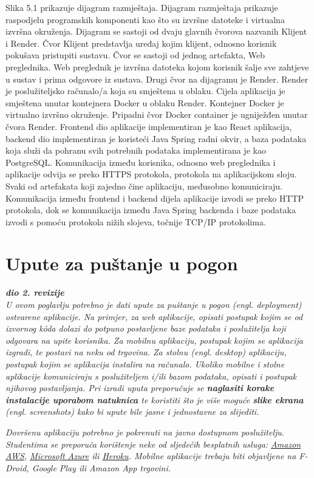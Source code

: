 			 Slika 5.1 prikazuje dijagram razmještaja. Dijagram razmještaja prikazuje raspodjelu programskih komponenti kao što su izvršne datoteke i virtualna izvršna okruženja. Dijagram se sastoji od dvaju glavnih čvorova nazvanih Klijent i Render. Čvor Klijent predstavlja uređaj kojim klijent, odnosno korisnik pokušava pristupiti sustavu. Čvor se sastoji od jednog artefakta, Web preglednika. Web preglednik je izvršna datoteka kojom korisnik šalje sve zahtjeve u sustav i prima odgovore iz sustava. Drugi čvor na dijagramu je Render. Render je poslužiteljsko računalo/a koja su smještena u oblaku. Cijela aplikacija je smještena unutar kontejnera Docker u oblaku Render. Kontejner Docker je virtualno izvršno okruženje. Pripadni čvor Docker container je ugniježđen unutar čvora Render. Frontend dio aplikacije implementiran je kao React aplikacija, backend dio implementiran je koristeći Java Spring radni okvir, a baza podataka koja služi da pohranu svih potrebnih podataka implementirana je kao PostgreSQL. Komunikacija između korisnika, odnosno web preglednika i aplikacije odvija se preko HTTPS protokola, protokola na aplikacijskom sloju. Svaki od artefakata koji zajedno čine aplikaciju, međusobno komuniciraju. Komunikacija između frontend i backend dijela aplikacije izvodi se preko HTTP protokola, dok se komunikacija između Java Spring backenda i baze podataka izvodi s pomoću protokola nižih slojeva, točnije TCP/IP protokolima.
			
			\eject 
		
		\section{Upute za puštanje u pogon}
		
			\textbf{\textit{dio 2. revizije}}\\
		
			 \textit{U ovom poglavlju potrebno je dati upute za puštanje u pogon (engl. deployment) ostvarene aplikacije. Na primjer, za web aplikacije, opisati postupak kojim se od izvornog kôda dolazi do potpuno postavljene baze podataka i poslužitelja koji odgovara na upite korisnika. Za mobilnu aplikaciju, postupak kojim se aplikacija izgradi, te postavi na neku od trgovina. Za stolnu (engl. desktop) aplikaciju, postupak kojim se aplikacija instalira na računalo. Ukoliko mobilne i stolne aplikacije komuniciraju s poslužiteljem i/ili bazom podataka, opisati i postupak njihovog postavljanja. Pri izradi uputa preporučuje se \textbf{naglasiti korake instalacije uporabom natuknica} te koristiti što je više moguće \textbf{slike ekrana} (engl. screenshots) kako bi upute bile jasne i jednostavne za slijediti.}
			
			
			 \textit{Dovršenu aplikaciju potrebno je pokrenuti na javno dostupnom poslužitelju. Studentima se preporuča korištenje neke od sljedećih besplatnih usluga: \href{https://aws.amazon.com/}{Amazon AWS}, \href{https://azure.microsoft.com/en-us/}{Microsoft Azure} ili \href{https://www.heroku.com/}{Heroku}. Mobilne aplikacije trebaju biti objavljene na F-Droid, Google Play ili Amazon App trgovini.}
			
			
			\eject 